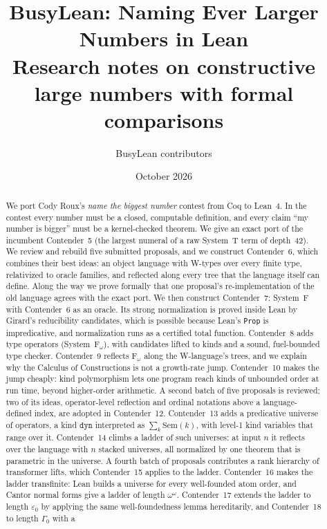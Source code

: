 \documentclass[11pt]{article}
\title{BusyLean: Naming Ever Larger Numbers in Lean\\[0.3em]
  \large Research notes on constructive large numbers with formal comparisons}
\author{BusyLean contributors}
\date{October 2026}
\theoremstyle{definition}
\theoremstyle{remark}
\begin{document}
\maketitle

\begin{abstract}
We port Cody Roux's \emph{name the biggest number} contest from Coq to Lean~4.
In the contest every number must be a closed, computable definition, and every
claim ``my number is bigger'' must be a kernel-checked theorem. We give an exact
port of the incumbent Contender~5 (the largest numeral of a raw System~T term of
depth~42). We review and rebuild five submitted proposals, and we construct
Contender~6, which combines their best ideas: an object language with W-types
over every finite type, relativized to oracle families, and reflected along
every tree that the language itself can define. Along the way we prove formally
that one proposal's re-implementation of the old language agrees with the exact
port. We then construct Contender~7: System~F with Contender~6 as an oracle.
Its strong normalization is proved inside Lean by Girard's reducibility
candidates, which is possible because Lean's \texttt{Prop} is impredicative,
and normalization runs as a certified total function. Contender~8 adds type
operators (System~F$_\omega$), with candidates lifted to kinds and a sound,
fuel-bounded type checker. Contender~9 reflects
F$_\omega$ along the W-language's trees, and we explain why the Calculus of
Constructions is not a growth-rate jump. Contender~10 makes the jump
cheaply: kind polymorphism lets one program reach kinds of unbounded order
at run time, beyond higher-order arithmetic. A second batch of five proposals is
reviewed; two of its ideas, operator-level reflection and ordinal notations
above a language-defined index, are adopted in Contender~12. Contender~13 adds a predicative universe of
operators, a kind $\mathtt{dyn}$ interpreted as $\sum_k\mathrm{Sem}(k)$, with
level-1 kind variables that range over it. Contender~14 climbs a ladder of
such universes: at input $n$ it reflects over the language with $n$ stacked
universes, all normalized by one theorem that is parametric in the universe.
A fourth batch of proposals contributes a rank hierarchy of transformer lifts,
which Contender~15 applies to the ladder. Contender~16 makes the ladder
transfinite: Lean builds a universe for every well-founded atom order, and
Cantor normal forms give a ladder of length $\omega^\omega$. Contender~17
extends the ladder to length $\varepsilon_0$ by applying the same
well-foundedness lemma hereditarily, and Contender~18 to length $\Gamma_0$ with a

\end{abstract}
\end{document}
